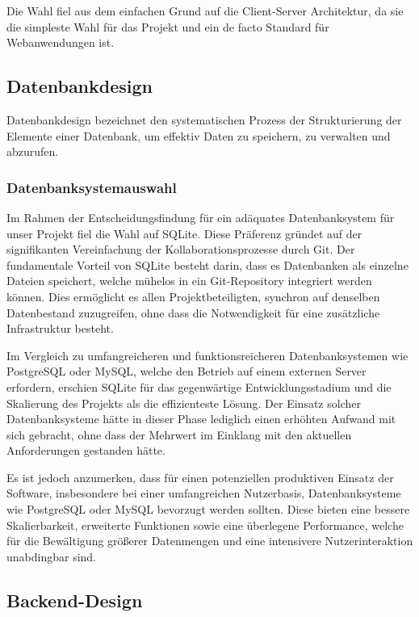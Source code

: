 Die Wahl fiel aus dem einfachen Grund auf die Client-Server Architektur, da sie die simpleste Wahl für das Projekt und ein de facto Standard für
Webanwendungen ist.

\subsection{Datenbankdesign}

Datenbankdesign bezeichnet den systematischen Prozess der Strukturierung der Elemente einer Datenbank, um effektiv Daten zu speichern, zu verwalten
und abzurufen.

\subsubsection{Datenbanksystemauswahl}
Im Rahmen der Entscheidungsfindung für ein adäquates Datenbanksystem für unser Projekt fiel die Wahl auf SQLite. Diese Präferenz gründet auf der
signifikanten Vereinfachung der Kollaborationsprozesse durch Git. Der fundamentale Vorteil von SQLite besteht darin, dass es Datenbanken als einzelne
Dateien speichert, welche mühelos in ein Git-Repository integriert werden können. Dies ermöglicht es allen Projektbeteiligten, synchron auf denselben
Datenbestand zuzugreifen, ohne dass die Notwendigkeit für eine zusätzliche Infrastruktur besteht.

Im Vergleich zu umfangreicheren und funktionsreicheren Datenbanksystemen wie PostgreSQL oder MySQL, welche den Betrieb auf einem externen Server erfordern,
erschien SQLite für das gegenwärtige Entwicklungsstadium und die Skalierung des Projekts als die effizienteste Lösung. Der Einsatz solcher Datenbanksysteme
hätte in dieser Phase lediglich einen erhöhten Aufwand mit sich gebracht, ohne dass der Mehrwert im Einklang mit den aktuellen Anforderungen gestanden hätte.

Es ist jedoch anzumerken, dass für einen potenziellen produktiven Einsatz der Software, insbesondere bei einer umfangreichen Nutzerbasis, Datenbanksysteme
wie PostgreSQL oder MySQL bevorzugt werden sollten. Diese bieten eine bessere Skalierbarkeit, erweiterte Funktionen sowie eine überlegene Performance, welche
für die Bewältigung größerer Datenmengen und eine intensivere Nutzerinteraktion unabdingbar sind.

\subsection{Backend-Design}

